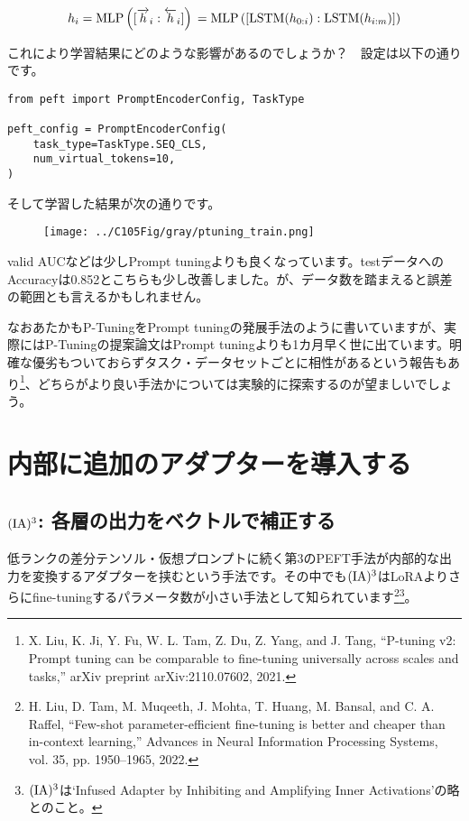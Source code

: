 \documentclass[a5paper,twoside,dvipdfmx]{jsarticle}
\begin{document}
$$
h_i = \mathrm{MLP} \left( [\overrightarrow{h}_i : \overleftarrow{h}_i] \right) \\
= \mathrm{MLP} \left( [\mathrm{LSTM}(h_{0:i}) : \mathrm{LSTM}(h_{i:m})] \right)
$$

これにより学習結果にどのような影響があるのでしょうか？　設定は以下の通りです。

\begin{lstlisting}
from peft import PromptEncoderConfig, TaskType
  
peft_config = PromptEncoderConfig(
    task_type=TaskType.SEQ_CLS,
    num_virtual_tokens=10,
)
\end{lstlisting}

そして学習した結果が次の通りです。

\newpage

\begin{figure}[h]
  \centering
  \texttt{[image: ../C105Fig/gray/ptuning\_train.png]}
 \end{figure} 

valid AUCなどは少しPrompt tuningよりも良くなっています。testデータへのAccuracyは0.852とこちらも少し改善しました。が、データ数を踏まえると誤差の範囲とも言えるかもしれません。

なおあたかもP-TuningをPrompt tuningの発展手法のように書いていますが、実際にはP-Tuningの提案論文はPrompt tuningよりも1カ月早く世に出ています。明確な優劣もついておらずタスク・データセットごとに相性があるという報告もあり\footnote{X. Liu, K. Ji, Y. Fu, W. L. Tam, Z. Du, Z. Yang, and J. Tang, “P-tuning v2: Prompt tuning can be comparable to fine-tuning universally across scales and tasks,” arXiv preprint arXiv:2110.07602, 2021.}、どちらがより良い手法かについては実験的に探索するのが望ましいでしょう。

\newpage

\section{内部に追加のアダプターを導入する}

\subsection{$\rm{(IA)^3}$: 各層の出力をベクトルで補正する}

低ランクの差分テンソル・仮想プロンプトに続く第3のPEFT手法が内部的な出力を変換するアダプターを挟むという手法です。その中でも$\rm{(IA)^3}$はLoRAよりさらにfine-tuningするパラメータ数が小さい手法として知られています\footnote{H. Liu, D. Tam, M. Muqeeth, J. Mohta, T. Huang, M. Bansal, and C. A. Raffel, “Few-shot parameter-efficient fine-tuning is better and cheaper than in-context learning,” Advances in Neural Information Processing Systems, vol. 35, pp. 1950–1965, 2022.}\footnote{$\rm{(IA)^3}$は`Infused Adapter by Inhibiting and Amplifying Inner Activations'の略とのこと。}。
\end{document}
